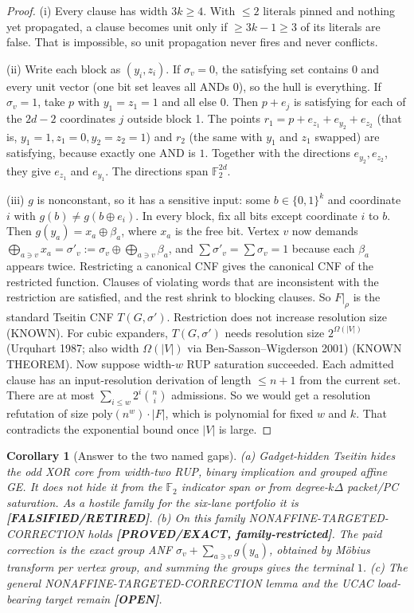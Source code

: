 \documentclass[11pt]{article}
\newtheorem{corollary}{Corollary}
\theoremstyle{definition}
\theoremstyle{remark}
\newcommand{\lab}[1]{\textbf{[#1]}}
\newcommand{\F}{\mathbb{F}}
\begin{document}
\begin{proof}
(i) Every clause has width $3k\ge4$. With $\le2$ literals pinned and nothing yet propagated,
a clause becomes unit only if $\ge3k-1\ge3$ of its literals are false. That is impossible, so
unit propagation never fires and never conflicts.

(ii) Write each block as $(y_i,z_i)$. If $\sigma_v=0$, the satisfying set contains $0$ and
every unit vector (one bit set leaves all ANDs $0$), so the hull is everything. If
$\sigma_v=1$, take $p$ with $y_1=z_1=1$ and all else $0$. Then $p+e_j$ is satisfying for each
of the $2d-2$ coordinates $j$ outside block 1. The points
$r_1=p+e_{z_1}+e_{y_2}+e_{z_2}$ (that is, $y_1=1,z_1=0,y_2=z_2=1$) and $r_2$ (the same with
$y_1$ and $z_1$ swapped) are satisfying, because exactly one AND is $1$. Together with the
directions $e_{y_2},e_{z_2}$, they give $e_{z_1}$ and $e_{y_1}$. The directions span
$\F_2^{2d}$.

(iii) $g$ is nonconstant, so it has a sensitive input: some $b\in\{0,1\}^k$ and coordinate
$i$ with $g(b)\ne g(b\oplus e_i)$. In every block, fix all bits except coordinate $i$ to $b$.
Then $g(y_a)=x_a\oplus\beta_a$, where $x_a$ is the free bit. Vertex $v$ now demands
$\bigoplus_{a\ni v}x_a=\sigma'_v:=\sigma_v\oplus\bigoplus_{a\ni v}\beta_a$, and
$\sum\sigma'_v=\sum\sigma_v=1$ because each $\beta_a$ appears twice. Restricting a canonical
CNF gives the canonical CNF of the restricted function. Clauses of violating words that are
inconsistent with the restriction are satisfied, and the rest shrink to blocking clauses. So
$F|_\rho$ is the standard Tseitin CNF $T(G,\sigma')$. Restriction does not increase
resolution size (KNOWN). For cubic expanders, $T(G,\sigma')$ needs resolution size
$2^{\Omega(|V|)}$ (Urquhart 1987; also width $\Omega(|V|)$ via Ben-Sasson--Wigderson 2001)
(KNOWN THEOREM). Now suppose width-$w$ RUP saturation succeeded. Each admitted clause has an
input-resolution derivation of length $\le n+1$ from the current set. There are at most
$\sum_{i\le w}2^i\binom ni$ admissions. So we would get a resolution refutation of size
$\mathrm{poly}(n^w)\cdot|F|$, which is polynomial for fixed $w$ and $k$. That contradicts the
exponential bound once $|V|$ is large.
\end{proof}

\begin{corollary}[Answer to the two named gaps]\label{cor:ans}
(a) Gadget-hidden Tseitin hides the odd XOR core from width-two RUP, binary implication and
grouped affine GE. It does not hide it from the $\F_2$ indicator span or from degree-$k\Delta$
packet/PC saturation. As a hostile family for the six-lane portfolio it is
\lab{FALSIFIED/RETIRED}. (b) On this family NONAFFINE-TARGETED-CORRECTION holds
\lab{PROVED/EXACT, family-restricted}. The paid correction is the exact group ANF
$\sigma_v+\sum_{a\ni v}g(y_a)$, obtained by Möbius transform per vertex group, and summing
the groups gives the terminal $1$. (c) The general NONAFFINE-TARGETED-CORRECTION lemma and the
UCAC load-bearing target remain \lab{OPEN}.
\end{corollary}
\end{document}
